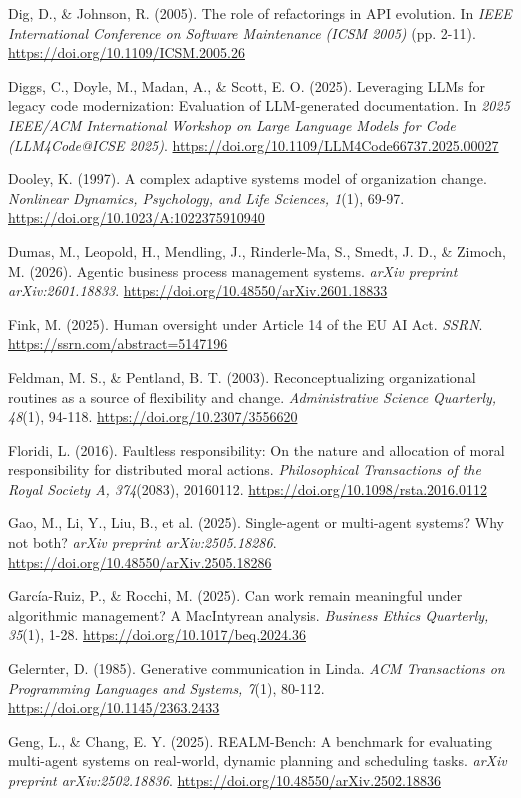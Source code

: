 Dig, D., \& Johnson, R. (2005). The role of refactorings in API
evolution. In \emph{IEEE International Conference on Software
Maintenance (ICSM 2005)} (pp. 2-11).
\url{https://doi.org/10.1109/ICSM.2005.26}

Diggs, C., Doyle, M., Madan, A., \& Scott, E. O. (2025). Leveraging LLMs
for legacy code modernization: Evaluation of LLM-generated
documentation. In \emph{2025 IEEE/ACM International Workshop on Large
Language Models for Code (LLM4Code@ICSE 2025)}.
\url{https://doi.org/10.1109/LLM4Code66737.2025.00027}

Dooley, K. (1997). A complex adaptive systems model of organization
change. \emph{Nonlinear Dynamics, Psychology, and Life Sciences, 1}(1),
69-97. \url{https://doi.org/10.1023/A:1022375910940}

Dumas, M., Leopold, H., Mendling, J., Rinderle-Ma, S., Smedt, J. D., \&
Zimoch, M. (2026). Agentic business process management systems.
\emph{arXiv preprint arXiv:2601.18833}.
\url{https://doi.org/10.48550/arXiv.2601.18833}

Fink, M. (2025). Human oversight under Article 14 of the EU AI Act.
\emph{SSRN}. \url{https://ssrn.com/abstract=5147196}

Feldman, M. S., \& Pentland, B. T. (2003). Reconceptualizing
organizational routines as a source of flexibility and change.
\emph{Administrative Science Quarterly, 48}(1), 94-118.
\url{https://doi.org/10.2307/3556620}

Floridi, L. (2016). Faultless responsibility: On the nature and
allocation of moral responsibility for distributed moral actions.
\emph{Philosophical Transactions of the Royal Society A, 374}(2083),
20160112. \url{https://doi.org/10.1098/rsta.2016.0112}

Gao, M., Li, Y., Liu, B., et al. (2025). Single-agent or multi-agent
systems? Why not both? \emph{arXiv preprint arXiv:2505.18286}.
\url{https://doi.org/10.48550/arXiv.2505.18286}

García-Ruiz, P., \& Rocchi, M. (2025). Can work remain meaningful under
algorithmic management? A MacIntyrean analysis. \emph{Business Ethics
Quarterly, 35}(1), 1-28. \url{https://doi.org/10.1017/beq.2024.36}

Gelernter, D. (1985). Generative communication in Linda. \emph{ACM
Transactions on Programming Languages and Systems, 7}(1), 80-112.
\url{https://doi.org/10.1145/2363.2433}

Geng, L., \& Chang, E. Y. (2025). REALM-Bench: A benchmark for
evaluating multi-agent systems on real-world, dynamic planning and
scheduling tasks. \emph{arXiv preprint arXiv:2502.18836}.
\url{https://doi.org/10.48550/arXiv.2502.18836}

